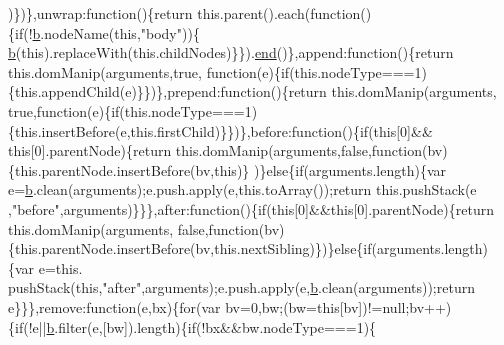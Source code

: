 \begin{DoxyCode}
      )\})\},unwrap:\textcolor{keyword}{function}()\{\textcolor{keywordflow}{return} this.parent().each(\textcolor{keyword}{function}()\{\textcolor{keywordflow}{if}(!\hyperlink{docs_2_programmer's_manual_2html_2jquery_8js_aa4026ad5544b958e54ce5e106fa1c805}{b}.nodeName(\textcolor{keyword}{this},\textcolor{stringliteral}{"body"}))\{
      \hyperlink{docs_2_programmer's_manual_2html_2jquery_8js_aa4026ad5544b958e54ce5e106fa1c805}{b}(\textcolor{keyword}{this}).replaceWith(this.childNodes)\}\}).\hyperlink{heap_8c_a57dfa4d169c6b9c0b4e7352bc0c34366}{end}()\},append:\textcolor{keyword}{function}()\{\textcolor{keywordflow}{return} this.domManip(arguments,\textcolor{keyword}{true},\textcolor{keyword}{
      function}(e)\{\textcolor{keywordflow}{if}(this.nodeType===1)\{this.appendChild(e)\}\})\},prepend:\textcolor{keyword}{function}()\{\textcolor{keywordflow}{return} this.domManip(arguments,\textcolor{keyword}{
      true},\textcolor{keyword}{function}(e)\{\textcolor{keywordflow}{if}(this.nodeType===1)\{this.insertBefore(e,this.firstChild)\}\})\},before:\textcolor{keyword}{function}()\{\textcolor{keywordflow}{if}(\textcolor{keyword}{this}[0]&&\textcolor{keyword}{
      this}[0].parentNode)\{\textcolor{keywordflow}{return} this.domManip(arguments,\textcolor{keyword}{false},\textcolor{keyword}{function}(bv)\{this.parentNode.insertBefore(bv,\textcolor{keyword}{this})\}
      )\}\textcolor{keywordflow}{else}\{\textcolor{keywordflow}{if}(arguments.length)\{var e=\hyperlink{docs_2_programmer's_manual_2html_2jquery_8js_aa4026ad5544b958e54ce5e106fa1c805}{b}.clean(arguments);e.push.apply(e,this.toArray());\textcolor{keywordflow}{return} this.pushStack(e
      ,\textcolor{stringliteral}{"before"},arguments)\}\}\},after:\textcolor{keyword}{function}()\{\textcolor{keywordflow}{if}(\textcolor{keyword}{this}[0]&&\textcolor{keyword}{this}[0].parentNode)\{\textcolor{keywordflow}{return} this.domManip(arguments,\textcolor{keyword}{
      false},\textcolor{keyword}{function}(bv)\{this.parentNode.insertBefore(bv,this.nextSibling)\})\}\textcolor{keywordflow}{else}\{\textcolor{keywordflow}{if}(arguments.length)\{var e=this.
      pushStack(\textcolor{keyword}{this},\textcolor{stringliteral}{"after"},arguments);e.push.apply(e,\hyperlink{docs_2_programmer's_manual_2html_2jquery_8js_aa4026ad5544b958e54ce5e106fa1c805}{b}.clean(arguments));\textcolor{keywordflow}{return} e\}\}\},\textcolor{keyword}{remove}:\textcolor{keyword}{function}(e,bx)\{\textcolor{keywordflow}{for}(var 
      bv=0,bw;(bw=\textcolor{keyword}{this}[bv])!=null;bv++)\{\textcolor{keywordflow}{if}(!e||\hyperlink{docs_2_programmer's_manual_2html_2jquery_8js_aa4026ad5544b958e54ce5e106fa1c805}{b}.filter(e,[bw]).length)\{\textcolor{keywordflow}{if}(!bx&&bw.nodeType===1)\{

\end{DoxyCode}
